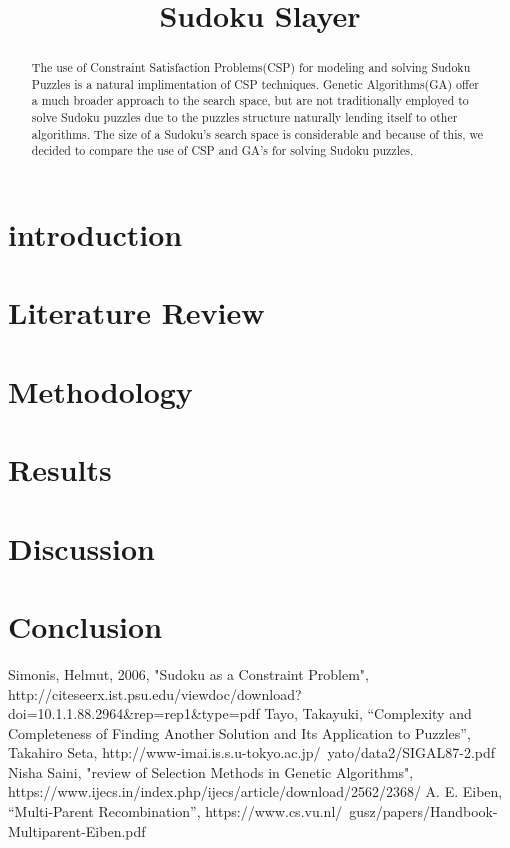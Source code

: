 \documentclass[10pt, conference]{IEEEtran}
\begin{document}
\title{Sudoku Slayer}

\author{
\and
{}
}

\maketitle

\begin{abstract}

The use of Constraint Satisfaction Problems(CSP) for modeling and solving Sudoku Puzzles is a natural implimentation of CSP techniques.
Genetic Algorithms(GA) offer a much broader approach to the search space, but are not traditionally employed to solve Sudoku puzzles due to the puzzles structure naturally lending itself to other algorithms.
The size of a Sudoku's search space is considerable and because of this, we decided to compare the use of CSP and GA's for solving Sudoku puzzles.

\end{abstract}

\section{introduction}

\section{Literature Review}

\section{Methodology}

\section{Results}

\section{Discussion}

\section{Conclusion}

\begin{thebibliography}{00}

Simonis, Helmut, 2006, "Sudoku as a Constraint Problem", http://citeseerx.ist.psu.edu/viewdoc/download?doi=10.1.1.88.2964\&rep=rep1\&type=pdf
Tayo, Takayuki, “Complexity and Completeness of Finding Another Solution and Its Application to Puzzles”, Takahiro Seta, http://www-imai.is.s.u-tokyo.ac.jp/~yato/data2/SIGAL87-2.pdf
Nisha Saini, "review of Selection Methods in Genetic Algorithms", https://www.ijecs.in/index.php/ijecs/article/download/2562/2368/
A. E. Eiben, “Multi-Parent Recombination”, https://www.cs.vu.nl/~gusz/papers/Handbook-Multiparent-Eiben.pdf

\end{thebibliography}
\end{document}
